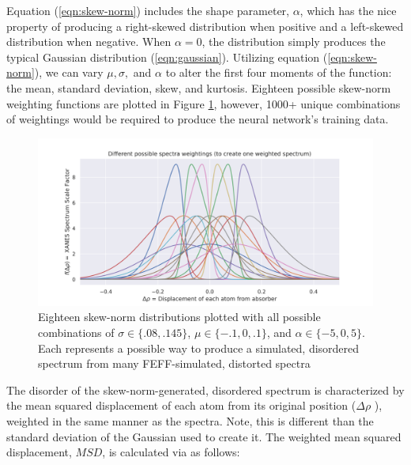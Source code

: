 
\noindent
Equation (\ref{eqn:skew-norm}) includes the shape parameter, $ \alpha $, which has the nice property of producing a right-skewed distribution when positive and a left-skewed distribution when negative. When $ \alpha=0 $, the distribution simply produces the typical Gaussian distribution (\ref{eqn:gaussian}). Utilizing equation (\ref{eqn:skew-norm}), we can vary $ \mu, \sigma,  $ and $ \alpha $ to alter the first four moments of the function: the mean, standard deviation, skew, and kurtosis. Eighteen possible skew-norm weighting functions are plotted in Figure \ref{fig:skew-norm-options}, however, 1000+ unique combinations of weightings would be required to produce the neural network's training data.

\begin{figure}[h!]
	\centering
	\includegraphics[width=\linewidth]{Chapters/Figures/skewnorm_options.png}
	\caption[Simulated Disordered Spectrum Weightings]{Eighteen skew-norm distributions plotted with all possible combinations of ${\sigma \in \{.08, .145\} }$, $ \mu \in \{-.1, 0, .1\} $, and $ \alpha \in \{-5,0,5\} $. Each represents a possible way to produce a simulated, disordered spectrum from many FEFF-simulated, distorted spectra} 
	\label{fig:skew-norm-options}
\end{figure}

The disorder of the skew-norm-generated, disordered spectrum is characterized by the mean squared displacement of each atom from its original position ($ \Delta\rho $ ), weighted in the same manner as the spectra. Note, this is different than the standard deviation of the Gaussian used to create it. The weighted mean squared displacement, $ MSD $, is calculated via as follows:

